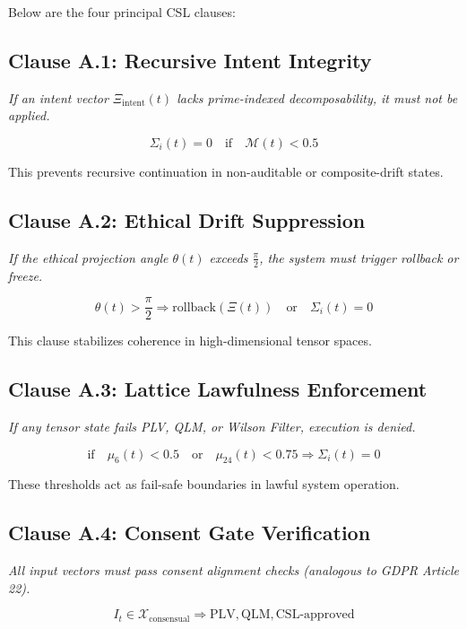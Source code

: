 \documentclass[12pt]{article}
\begin{document}
Below are the four principal CSL clauses:

\subsection*{Clause A.1: Recursive Intent Integrity}
\textit{If an intent vector $\Xi_{\text{intent}}(t)$ lacks prime-indexed decomposability, it must not be applied.}

\begin{equation}
\Sigma_i(t) = 0 \quad \text{if} \quad \mathcal{M}(t) < 0.5
\end{equation}

This prevents recursive continuation in non-auditable or composite-drift states.

\subsection*{Clause A.2: Ethical Drift Suppression}
\textit{If the ethical projection angle $\theta(t)$ exceeds $\frac{\pi}{2}$, the system must trigger rollback or freeze.}

\begin{equation}
\theta(t) > \frac{\pi}{2} \Rightarrow \text{rollback}(\Xi(t)) \quad \text{or} \quad \Sigma_i(t) = 0
\end{equation}

This clause stabilizes coherence in high-dimensional tensor spaces.

\subsection*{Clause A.3: Lattice Lawfulness Enforcement}
\textit{If any tensor state fails PLV, QLM, or Wilson Filter, execution is denied.}

\begin{equation}
\text{if} \quad \mu_6(t) < 0.5 \quad \text{or} \quad \mu_{24}(t) < 0.75 \Rightarrow \Sigma_i(t) = 0
\end{equation}

These thresholds act as fail-safe boundaries in lawful system operation.

\subsection*{Clause A.4: Consent Gate Verification}
\textit{All input vectors must pass consent alignment checks (analogous to GDPR Article 22).}

\begin{equation}
I_t \in \mathcal{X}_{\text{consensual}} \Rightarrow \text{PLV}, \text{QLM}, \text{CSL}\text{-approved}
\end{equation}
\end{document}
